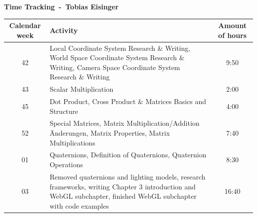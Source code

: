 \textbf{\huge Time Tracking~-~Tobias Eisinger}

\begin{table}[H]
    \centering
    \begin{tabularx}{\textwidth}{|c|X|c|} %
        \hline %
        Calendar week & Activity                                                                                                                                                                                                                          & Amount of hours \\
        \hline %
        42            & Local Coordinate System Research \& Writing, World Space Coordinate System Research \& Writing, Camera Space Coordinate System Research \& Writing                                                                                & 9:50            \\
        \hline %
        43            & Scalar Multiplication                                                                                                                                                                                                             & 2:00            \\
        \hline %
        45            & Dot Product, Cross Product \& Matrices Basics and Structure                                                                                                                                                                       & 4:00            \\
        \hline %
        52            & Special Matrices, Matrix Multiplication/Addition Änderungen, Matrix Properties, Matrix Multiplications                                                                                                                            & 7:40            \\
        \hline %
        01            & Quaternions, Definition of Quaternions, Quaternion Operations                                                                                                                                                                     & 8:30            \\
        \hline %
        03            & Removed quaternions and lighting models, research frameworks, writing Chapter 3 introduction and WebGL subchapter, finished WebGL subchapter with code examples                                                                   & 16:40           \\

\end{tabularx}
\end{table}
